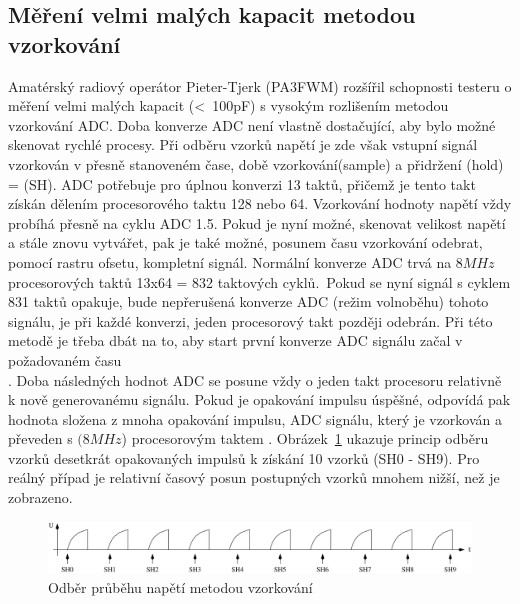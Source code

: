 \subsection{Měření velmi malých kapacit metodou vzorkování}
Amatérský radiový operátor Pieter-Tjerk (PA3FWM) rozšířil schopnosti testeru o měření velmi
malých kapacit (\textless~100pF) s vysokým rozlišením metodou vzorkování ADC.
Doba konverze ADC není vlastně dostačující, aby bylo možné skenovat rychlé procesy.
Při odběru vzorků napětí je zde však vstupní signál vzorkován v přesně stanoveném čase,
době vzorkování(sample) a přidržení (hold) = (SH).
ADC potřebuje pro úplnou konverzi 13 taktů,
přičemž je tento takt získán dělením procesorového taktu 128 nebo 64.
Vzorkování hodnoty napětí vždy probíhá přesně na cyklu ADC 1.5.
Pokud je nyní možné, skenovat velikost napětí a stále znovu vytvářet, pak je také možné,
posunem času vzorkování odebrat, pomocí rastru ofsetu, kompletní signál.
Normální konverze ADC trvá na \(8MHz\) procesorových taktů 13x64 = 832 taktových cyklů.\
Pokud se nyní signál s cyklem 831 taktů opakuje, bude nepřerušená konverze ADC (režim volnoběhu) tohoto
signálu, je při každé konverzi, jeden procesorový takt později odebrán.
Při této metodě je třeba dbát na to, aby start první konverze ADC signálu  začal v požadovaném času\\.
Doba následných hodnot ADC se posune vždy o jeden takt procesoru relativně k nově generovanému signálu.
Pokud je opakování impulsu úspěšné, odpovídá pak hodnota složena z mnoha opakování impulsu, ADC signálu,
který je vzorkován a převeden s \((8MHz\)) procesorovým taktem .
Obrázek~\ref{fig:sampling} ukazuje princip odběru vzorků desetkrát opakovaných
impulsů k získání 10 vzorků (SH0 - SH9).
Pro reálný případ je relativní časový posun postupných vzorků mnohem nižší, než je zobrazeno.

\begin{figure}[H]
\centering
\includegraphics[width=1.\textwidth]{../FIG/sampling.pdf}
\caption{Odběr průběhu napětí metodou vzorkování}
\label{fig:sampling}
\end{figure}

